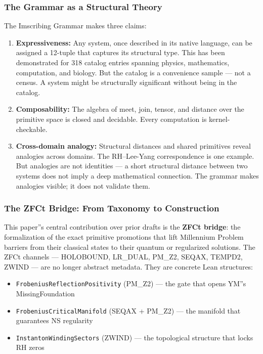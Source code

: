 \documentclass[12pt,a4paper]{article}
\begin{document}
\subsubsection{The Grammar as a Structural Theory}

The Imscribing Grammar makes three claims:

\begin{enumerate}
    \item \textbf{Expressiveness:} Any system, once described in its native language, can be assigned a 12-tuple that captures its structural type. This has been demonstrated for 318 catalog entries spanning physics, mathematics, computation, and biology. But the catalog is a convenience sample --- not a census. A system might be structurally significant without being in the catalog.
    \item \textbf{Composability:} The algebra of meet, join, tensor, and distance over the primitive space is closed and decidable. Every computation is kernel-checkable.
    \item \textbf{Cross-domain analogy:} Structural distances and shared primitives reveal analogies across domains. The RH--Lee-Yang correspondence is one example. But analogies are not identities --- a short structural distance between two systems does not imply a deep mathematical connection. The grammar makes analogies visible; it does not validate them.
\end{enumerate}

\subsubsection{The ZFCt Bridge: From Taxonomy to Construction}

This paper''s central contribution over prior drafts is the \textbf{ZFCt bridge}: the formalization of the exact primitive promotions that lift Millennium Problem barriers from their classical states to their quantum or regularized solutions. The ZFCt channels --- HOLOBOUND, LR\_DUAL, PM\_Z2, SEQAX, TEMPD2, ZWIND --- are no longer abstract metadata. They are concrete Lean structures:

\begin{itemize}
    \item \texttt{FrobeniusReflectionPositivity} (PM\_Z2) --- the gate that opens YM''s MissingFoundation
    \item \texttt{FrobeniusCriticalManifold} (SEQAX + PM\_Z2) --- the manifold that guarantees NS regularity
    \item \texttt{InstantonWindingSectors} (ZWIND) --- the topological structure that locks RH zeros
\end{itemize}
\end{document}

